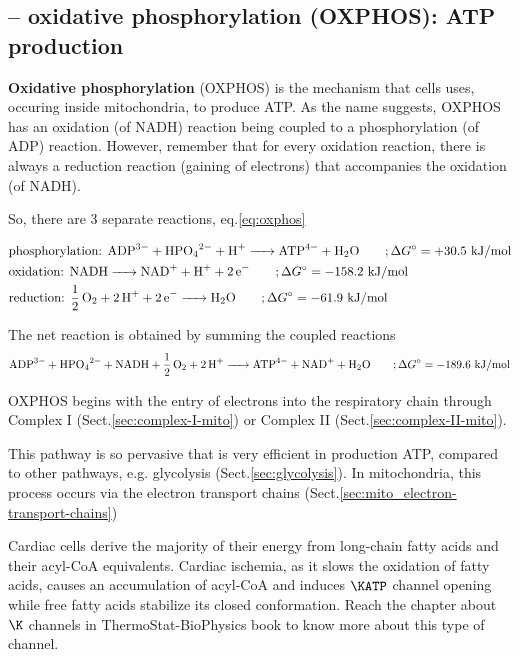 \subsection{-- oxidative phosphorylation (OXPHOS): ATP production}
\label{sec:oxidative-phosphorylation}
\label{sec:ATP-production-inside-mitochondria}
\label{sec:OXPHOS}

{\bf Oxidative phosphorylation} (OXPHOS) is the mechanism that cells uses,
occuring inside mitochondria, to produce ATP. As the name suggests, OXPHOS has
an oxidation (of NADH) reaction being coupled to a phosphorylation (of ADP) reaction.
However, remember that for every oxidation reaction, there is always a reduction
reaction (gaining of electrons) that accompanies the oxidation (of NADH).

So, there are 3 separate reactions, eq.\ref{eq:oxphos}

{\tiny
\begin{equation}
\label{eq:oxphos}
\begin{split}
&\text{phosphorylation: }  \ce{ADP^{3-} + HPO_4^{2-} + H^+ -> ATP^{4-} + H2O }
\qquad ; \Delta G^\circ = + 30.5 \text{ kJ/mol} \\
&\text{oxidation: } \ce{NADH -> NAD+ + H+ + 2e^-} \qquad; \Delta G^\circ =
-158.2 \text{ kJ/mol} \\
&\text{reduction: } \ce{ 1/2 O2 + 2H+ + 2e^- -> H2O} \qquad; \Delta G^\circ =
-61.9 \text{ kJ/mol}
\end{split}
\end{equation}
}

The net reaction is obtained by summing the coupled reactions
{\tiny
\begin{equation}
\ce{ADP^{3-} + HPO_4^{2-} + NADH + 1/2 O2 + 2H+ -> ATP^{4-} + NAD+ + H2O}
\qquad; \Delta G^\circ = -189.6 \text{ kJ/mol}
\end{equation}
}

OXPHOS begins with the entry of electrons into the respiratory chain through
Complex I (Sect.\ref{sec:complex-I-mito}) or Complex II
(Sect.\ref{sec:complex-II-mito}).

This pathway is so pervasive that is very efficient in production ATP,
compared to other pathways, e.g. glycolysis (Sect.\ref{sec:glycolysis}).
In mitochondria, this process occurs via the electron transport chains
(Sect.\ref{sec:mito_electron-transport-chains})


Cardiac cells derive the majority of their energy from long-chain fatty acids
and their acyl-CoA equivalents. Cardiac ischemia, as it slows the oxidation of
fatty acids, causes an accumulation of acyl-CoA and induces $\KATP$ channel
opening while free fatty acids stabilize its closed conformation. Reach the
chapter about $\K$ channels in ThermoStat-BioPhysics book to know more about
this type of channel.

